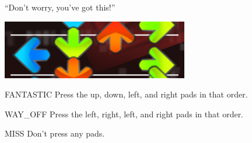 ``Don't worry, you've got this!''

\begin{center}
  \includegraphics{itg-udlr.png}
\end{center}

\begin{switch}
\item{FANTASTIC}
  Press the up, down, left, and right pads in that order.
\item{WAY\_OFF}
  Press the left, right, left, and right pads in that order.
\item{MISS}
  Don't press any pads.
\end{switch}


